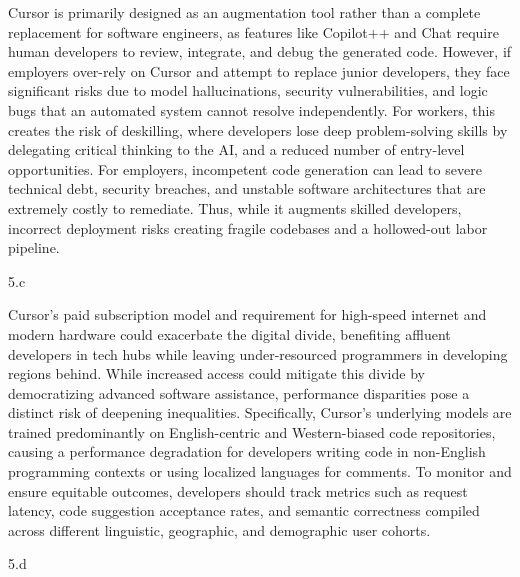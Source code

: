 \begin{answer}
  Cursor is primarily designed as an augmentation tool rather than a complete replacement for software engineers, as features like Copilot++ and Chat require human developers to review, integrate, and debug the generated code. However, if employers over-rely on Cursor and attempt to replace junior developers, they face significant risks due to model hallucinations, security vulnerabilities, and logic bugs that an automated system cannot resolve independently. For workers, this creates the risk of deskilling, where developers lose deep problem-solving skills by delegating critical thinking to the AI, and a reduced number of entry-level opportunities. For employers, incompetent code generation can lead to severe technical debt, security breaches, and unstable software architectures that are extremely costly to remediate. Thus, while it augments skilled developers, incorrect deployment risks creating fragile codebases and a hollowed-out labor pipeline.
\end{answer}

\LARGE
5.c
\normalsize

\begin{answer}
  Cursor's paid subscription model and requirement for high-speed internet and modern hardware could exacerbate the digital divide, benefiting affluent developers in tech hubs while leaving under-resourced programmers in developing regions behind. While increased access could mitigate this divide by democratizing advanced software assistance, performance disparities pose a distinct risk of deepening inequalities. Specifically, Cursor's underlying models are trained predominantly on English-centric and Western-biased code repositories, causing a performance degradation for developers writing code in non-English programming contexts or using localized languages for comments. To monitor and ensure equitable outcomes, developers should track metrics such as request latency, code suggestion acceptance rates, and semantic correctness compiled across different linguistic, geographic, and demographic user cohorts.
\end{answer}

\LARGE
5.d
\normalsize

